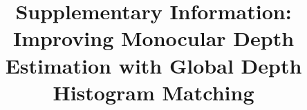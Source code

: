 \documentclass[10pt,letterpaper]{article}
\begin{document}
\title{Supplementary Information: Improving Monocular Depth Estimation with
  Global Depth Histogram Matching}

\maketitle


\end{document}
